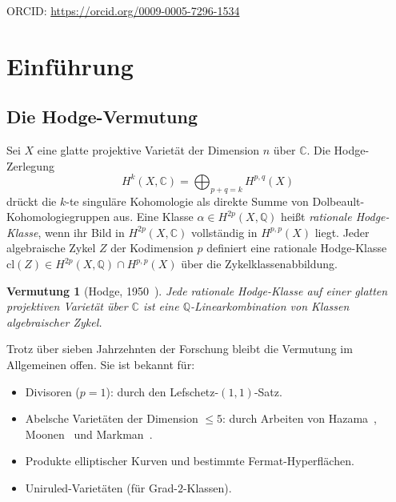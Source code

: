 \documentclass[aps,prd,twocolumn,superscriptaddress,nofootinbib]{revtex4-2}
\newtheorem{conjecture}[theorem]{Vermutung}
\theoremstyle{definition}
\theoremstyle{remark}
\def\\{ }%
\begin{document}

\maketitle

\begin{center}
\footnotesize
ORCID: \url{https://orcid.org/0009-0005-7296-1534}\\
\end{center}

\clearpage
\tableofcontents
\clearpage

\section{Einführung}
\label{sec:intro}

\subsection{Die Hodge-Vermutung}

Sei $X$ eine glatte projektive Varietät der Dimension $n$ über $\mathbb{C}$. Die Hodge-Zerlegung
\begin{equation}
H^k(X, \mathbb{C}) = \bigoplus_{p+q=k} H^{p,q}(X)
\label{eq:hodge_decomp}
\end{equation}
drückt die $k$-te singuläre Kohomologie als direkte Summe von Dolbeault-Kohomologiegruppen aus. Eine Klasse $\alpha \in H^{2p}(X, \mathbb{Q})$ heißt \textit{rationale Hodge-Klasse}, wenn ihr Bild in $H^{2p}(X, \mathbb{C})$ vollständig in $H^{p,p}(X)$ liegt. Jeder algebraische Zykel $Z$ der Kodimension $p$ definiert eine rationale Hodge-Klasse $\mathrm{cl}(Z) \in H^{2p}(X, \mathbb{Q}) \cap H^{p,p}(X)$ über die Zykelklassenabbildung.

\begin{conjecture}[Hodge, 1950~\cite{Hodge1950}]
\label{conj:hodge}
Jede rationale Hodge-Klasse auf einer glatten projektiven Varietät über $\mathbb{C}$ ist eine $\mathbb{Q}$-Linearkombination von Klassen algebraischer Zykel.
\end{conjecture}

Trotz über sieben Jahrzehnten der Forschung bleibt die Vermutung im Allgemeinen offen. Sie ist bekannt für:
\begin{itemize}
\item Divisoren ($p = 1$): durch den Lefschetz-$(1,1)$-Satz.
\item Abelsche Varietäten der Dimension $\leq 5$: durch Arbeiten von Hazama~\cite{Hazama1994}, Moonen~\cite{Moonen1999} und Markman~\cite{Markman2025}.
\item Produkte elliptischer Kurven und bestimmte Fermat-Hyperflächen.
\item Uniruled-Varietäten (für Grad-$2$-Klassen).
\end{itemize}
\end{document}
